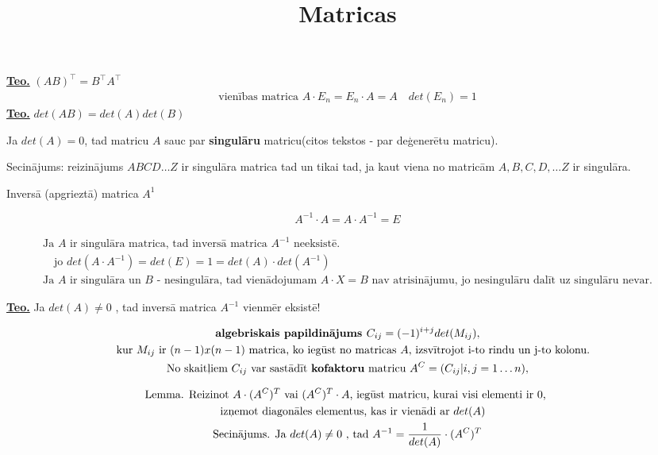 \documentclass[12pt]{article}
\title{Matricas}
\author{}
\date{}
\begin{document}
\maketitle

\textbf{\underline{Teo.}}  $(AB)^\intercal = B ^\intercal A ^\intercal$
\begin{gather*} 
	\text{vienības matrica } A \cdot E_n = E_n \cdot A = A  \quad det(E_n)=1
\end{gather*}
\textbf{\underline{Teo.}}  $det(AB) = det(A)det(B)$

Ja $det(A)=0$, tad matricu $A$ sauc par \textbf{singulāru} matricu(citos tekstos - par deģenerētu matricu).

Secinājums: reizinājums $ABCD \ldots Z$ ir singulāra matrica tad un tikai tad, ja kaut viena no matricām $A, B, C, D, \ldots Z $ ir singulāra.

\pagebreak

Inversā (apgrieztā) matrica $A^1$

$$
A^{-1} \cdot A=A \cdot A^{-1}= E
$$

\begin{gather*}
 	\text{Ja } A  \text{ ir singulāra matrica, tad inversā matrica } A^{-1} \text{ neeksistē.} \\
	\quad \text{jo }  det(A \cdot A^{-1}) = det(E) = 1 = det(A) \cdot det(A^{-1}) \\
	\text{Ja $A$ ir singulāra un $B$ - nesingulāra, tad vienādojumam $A \cdot X = B$ nav atrisinājumu, jo nesingulāru dalīt uz singulāru nevar.}
\end{gather*}

\textbf{\underline{Teo.}} Ja $det(A) \neq 0$ , tad inversā matrica $A^{-1}$ vienmēr eksistē!
 
\begin{gather*}
	\textbf{algebriskais papildinājums } C_{ij} =  (-1)^{i+ j} det(M_{ij}), \\
	\text{\quad kur  $M_{ij}$ ir $(n-1)x(n-1)$ matrica, ko iegūst no matricas $A$, izsvītrojot i-to rindu un j-to kolonu.}\\
	\text{No skaitļiem $C_{ij}$ var sastādīt \textbf{kofaktoru} matricu $A^C  = (C_{ij} | i, j = 1 \ldots n)$},
\end{gather*}

\begin{gather*}
 	\text{Lemma. Reizinot $A \cdot (A^C)^T$ vai $(A^C)^T \cdot A$, iegūst matricu, kurai visi elementi ir 0, }\\ 
 		\text{ \quad izņemot diagonāles elementus, kas ir vienādi ar $det(A)$ } \\
	\text{Secinājums. Ja $det(A) \neq 0$ , tad $A^{-1} = \frac{1}{det(A)} \cdot (A^C)^T $}
\end{gather*}
\end{document}
